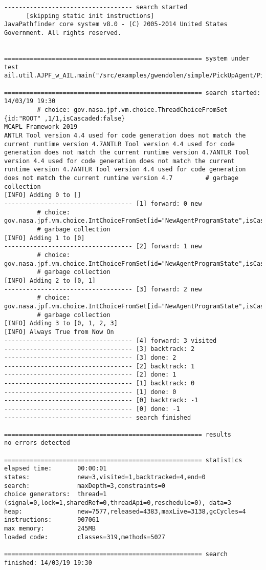 \noindent \begin{lstlisting}
----------------------------------- search started
      [skipping static init instructions]
JavaPathfinder core system v8.0 - (C) 2005-2014 United States Government. All rights reserved.


====================================================== system under test
ail.util.AJPF_w_AIL.main("/src/examples/gwendolen/simple/PickUpAgent/PickUpAgent.ail","/src/examples/gwendolen/simple/PickUpAgent/PickUpAgent.psl","0")

====================================================== search started: 14/03/19 19:30
		 # choice: gov.nasa.jpf.vm.choice.ThreadChoiceFromSet {id:"ROOT" ,1/1,isCascaded:false}
MCAPL Framework 2019
ANTLR Tool version 4.4 used for code generation does not match the current runtime version 4.7ANTLR Tool version 4.4 used for code generation does not match the current runtime version 4.7ANTLR Tool version 4.4 used for code generation does not match the current runtime version 4.7ANTLR Tool version 4.4 used for code generation does not match the current runtime version 4.7		 # garbage collection
[INFO] Adding 0 to []
----------------------------------- [1] forward: 0 new
		 # choice: gov.nasa.jpf.vm.choice.IntChoiceFromSet[id="NewAgentProgramState",isCascaded:false,>0]
		 # garbage collection
[INFO] Adding 1 to [0]
----------------------------------- [2] forward: 1 new
		 # choice: gov.nasa.jpf.vm.choice.IntChoiceFromSet[id="NewAgentProgramState",isCascaded:false,>0]
		 # garbage collection
[INFO] Adding 2 to [0, 1]
----------------------------------- [3] forward: 2 new
		 # choice: gov.nasa.jpf.vm.choice.IntChoiceFromSet[id="NewAgentProgramState",isCascaded:false,>0]
		 # garbage collection
[INFO] Adding 3 to [0, 1, 2, 3]
[INFO] Always True from Now On
----------------------------------- [4] forward: 3 visited
----------------------------------- [3] backtrack: 2
----------------------------------- [3] done: 2
----------------------------------- [2] backtrack: 1
----------------------------------- [2] done: 1
----------------------------------- [1] backtrack: 0
----------------------------------- [1] done: 0
----------------------------------- [0] backtrack: -1
----------------------------------- [0] done: -1
----------------------------------- search finished

====================================================== results
no errors detected

====================================================== statistics
elapsed time:       00:00:01
states:             new=3,visited=1,backtracked=4,end=0
search:             maxDepth=3,constraints=0
choice generators:  thread=1 (signal=0,lock=1,sharedRef=0,threadApi=0,reschedule=0), data=3
heap:               new=7577,released=4383,maxLive=3138,gcCycles=4
instructions:       907061
max memory:         245MB
loaded code:        classes=319,methods=5027

====================================================== search finished: 14/03/19 19:30
\end{lstlisting}


